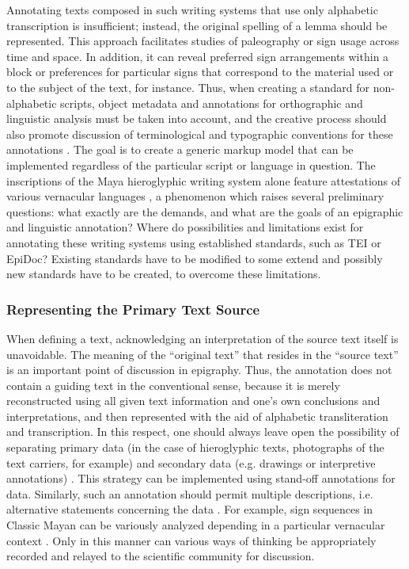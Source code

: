 \documentclass[amsthm,ebook]{saparticle}
\begin{document}
Annotating texts composed in such writing systems that use only alphabetic transcription is insufficient; instead, the
original spelling of a lemma should be represented. This approach facilitates studies of paleography or sign usage
across time and space. In addition, it can reveal preferred sign arrangements within a block or preferences for
particular signs that correspond to the material used or to the subject of the text, for instance.
Thus, when creating a standard for non-alphabetic scripts, object metadata and annotations for orthographic and
linguistic analysis must be taken into account, and the creative process should also promote discussion of
terminological and typographic conventions for these annotations \citep{SachseDurr2015}. The goal is to create a generic
markup model that can be implemented regardless of the particular script or language in question. The inscriptions of
the Maya hieroglyphic writing system alone feature attestations of various vernacular languages \citep{LacadenaWichmann2002}, a phenomenon which raises several preliminary questions: what exactly are the demands, and what are the goals of
an epigraphic and linguistic annotation? Where do possibilities and limitations exist for annotating these writing
systems using established standards, such as TEI or EpiDoc? Existing standards have to be modified to some extend and
possibly new standards have to be created, to overcome these limitations. 

\subsubsection[Representing the Primary Text Source]{Representing the Primary Text Source}
When defining a text, acknowledging an interpretation of the source text itself is unavoidable. The meaning of the
``original text'' that resides in the ``source text'' is an important point of discussion in epigraphy. Thus, the
annotation does not contain a guiding text in the conventional sense, because it is merely reconstructed using all
given text information and one’s own conclusions and interpretations, and then represented with the aid of alphabetic
transliteration and transcription. In this respect, one should always leave open the possibility of separating primary
data (in the case of hieroglyphic texts, photographs of the text carriers, for example) and secondary data (e.g.
drawings or interpretive annotations) \citep{Stuhrenberg2012}. This strategy can be implemented using stand-off annotations
for data. Similarly, such an annotation should permit multiple descriptions, i.e. alternative statements concerning the
data \citep{Stuhrenberg2012}. For example, sign sequences in Classic Mayan can be variously analyzed depending in a
particular vernacular context \citep{Gronemeyer2014}. Only in this manner can various ways of thinking be appropriately
recorded and relayed to the scientific community for discussion. 
\end{document}
